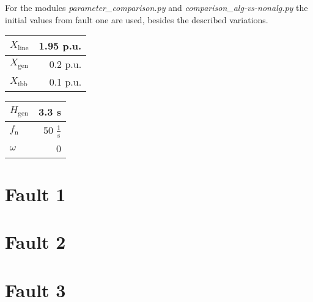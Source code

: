 \flushleft
For the modules {\itshape parameter\_comparison.py} and {\itshape comparison\_alg-vs-nonalg.py} the initial values from fault one are used, besides the described variations. \\[24pt]

\begin{minipage}[l]{.49\textwidth}
    \begin{tabular}{l|r}
        $X_\mathrm{line}$       & 1.95 p.u. \\ \hline
        $X_\mathrm{gen}$        & 0.2 p.u. \\ \hline
        $X_\mathrm{ibb}$        & 0.1 p.u. \\ 
    \end{tabular}
\end{minipage}
\begin{minipage}[r]{.49\textwidth}
    \begin{tabular}{l|r}
        $H_\mathrm{gen}$        & 3.3 s \\ \hline
        $f_\mathrm{n}$          & 50 $\mathrm{\frac{1}{s}}$ \\ \hline
        $\omega$                & 0 \\ 
    \end{tabular}
\end{minipage}

\section{Fault 1}
\label{app:fault1}







\section{Fault 2}
\label{app:fault2}







\section{Fault 3}
\label{app:fault3}



